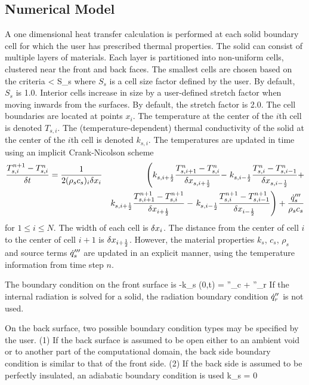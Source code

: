 \subsection{Numerical Model}

A one dimensional heat transfer calculation is performed at each solid
boundary cell for which the user has prescribed thermal
properties. The solid can consist of multiple layers of materials.
Each layer is partitioned into non-uniform cells, clustered near the
front and back faces.  The smallest cells are chosen based on the
criteria
\be \dx < S_s \ee
where $S_s$ is a cell size factor defined by the user. By default,
$S_s$ is 1.0.  Interior cells increase in size by a user-defined
stretch factor when moving inwards from the surfaces. By default, the
stretch factor is 2.0. The cell boundaries are located at points
$x_i$. The temperature at the center of the $i$th cell is denoted $T_{s,i}$.
The (temperature-dependent) thermal conductivity of the solid
at the center of the $i$th cell is denoted $k_{s,i}$.
The temperatures are updated in time using an implicit
Crank-Nicolson scheme
\begin{eqnarray}
    \frac{T_{s,i}^{n+1}-T_{s,i}^n}{\delta t} = \frac{1}{2 (\rho_s c_s)_i \delta x_{i} }
& & \left(
    k_{s,i+\frac{1}{2}}\frac{T_{s,i+1}^n-T_{s,i}^n}{\delta x_{s,i+\frac{1}{2}}} - \right.
    k_{s,i-\frac{1}{2}}\frac{T_{s,i}^n-T_{s,i-1}^n}{\delta x_{s,i-\frac{1}{2}}} +  \nonumber \\
& & k_{s,i+\frac{1}{2}}\frac{T_{s,i+1}^{n+1}-T_{s,i}^{n+1}}{\delta x_{i+\frac{1}{2}}} -
    \left.
    k_{s,i-\frac{1}{2}}\frac{T_{s,i}^{n+1}-T_{s,i-1}^{n+1}}{\delta x_{i-\frac{1}{2}}}
     \right)
    + \frac{\dot{q}_s'''}{\rho_s c_s}
\end{eqnarray}
for $1 \le i \le N$. The width of each cell is $\delta x_i$. The distance
from the center of cell $i$ to the center of cell $i+1$ is
$\delta x_{i+\frac{1}{2}}$. However, the material properties $k_s$, $c_s$, $\rho_s$
and source terms $\dot{q}_s'''$ are updated in an explicit manner, using
the temperature information from time step $n$.


The boundary condition on the front surface is
\be  -k_s (0,t) =  \dq''_c + \dq''_r \ee
If the internal radiation is solved for a solid, the radiation
boundary condition $\dot{q}''_r$ is not used.

On the back surface, two possible boundary condition types may be
specified by the user. (1) If the back surface is assumed to be open
either to an ambient
void or to another part of the computational domain,
the back side boundary condition is similar to that of
the front side. (2) If the back side is assumed to be perfectly insulated,
an adiabatic boundary condition is used
\be  k_s  =  0 \ee

